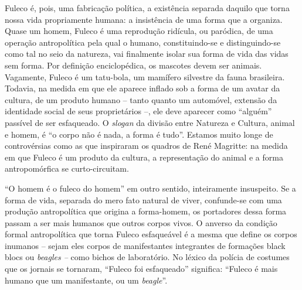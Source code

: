 Fuleco é, pois, uma fabricação política, a existência separada daquilo
que torna nossa vida propriamente humana: a insistência de uma forma que
a organiza. Quase um homem, Fuleco é uma reprodução ridícula, ou
paródica, de uma operação antropolítica pela qual o humano,
constituindo-se e distinguindo-se como tal no seio da natureza, vai
finalmente isolar sua forma de vida das vidas sem forma. Por definição
enciclopédica, os mascotes devem ser animais. Vagamente, Fuleco é um
tatu-bola, um mamífero silvestre da fauna brasileira. Todavia, na medida
em que ele aparece inflado sob a forma de um avatar da cultura, de um
produto humano -- tanto quanto um automóvel, extensão da identidade
social de seus proprietários --, ele deve aparecer como ``alguém''
passível de ser esfaqueado. O \emph{slogan} da divisão entre Natureza e
Cultura, animal e homem, é ``o corpo não é nada, a forma é tudo''.
Estamos muito longe de controvérsias como as que inspiraram os quadros
de René\emph{ }Magritte: na medida em que Fuleco é um produto da
cultura, a representação do animal e a forma antropomórfica se
curto-circuitam.

``O homem é o fuleco do homem'' em outro sentido, inteiramente
insuspeito. Se a forma de vida, separada do mero fato natural de viver,
confunde-se com uma produção antropolítica que origina a forma-homem, os
portadores dessa forma passam a ser mais humanos que outros corpos
vivos. O anverso da condição formal antropolítica que torna Fuleco
esfaqueável é a mesma que define os corpos inumanos -- sejam eles corpos
de manifestantes integrantes de formações black blocs ou \emph{beagles
--} como bichos de laboratório. No léxico da polícia de costumes que os
jornais se tornaram, ``Fuleco foi esfaqueado'' significa: ``Fuleco é
mais humano que um manifestante, ou um \emph{beagle}''.

